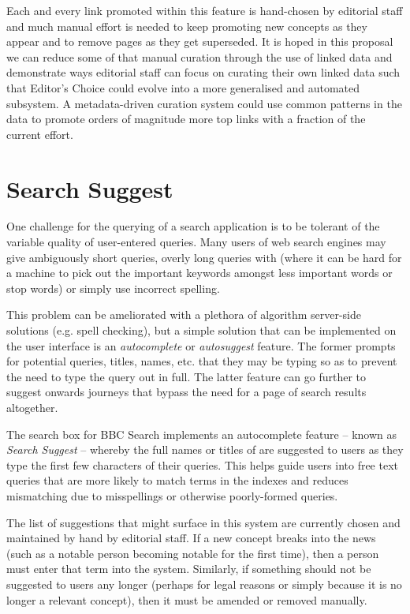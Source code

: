 Each and every link promoted within this feature is hand-chosen by editorial
staff and much manual effort is needed to keep promoting new concepts
as they appear and to remove pages as they get superseded. It is hoped
in this proposal we can reduce some of that manual curation through the use
of linked data and demonstrate ways editorial staff can focus on curating
their own linked data such that Editor's Choice could evolve into a more
generalised and automated subsystem. A metadata-driven curation system
could use common patterns in the data to promote orders of magnitude more
top links with a fraction of the current effort.

\section{Search Suggest}

One challenge for the querying of a search application is to be tolerant
of the variable quality of user-entered queries. Many users of web search
engines may give ambiguously short queries, overly long queries with (where
it can be hard for a machine to pick out the important keywords amongst
less important words or stop words\cite{rajaraman2011data})
or simply use incorrect spelling.

This problem can be ameliorated with a plethora of algorithm
server-side solutions (e.g. spell checking), but a simple solution that
can be implemented on the user interface is an \emph{autocomplete}
or \emph{autosuggest} feature. The former prompts for potential
queries, titles, names, etc. that they may be typing so as to prevent
the need to type the query out in full. The latter feature can go
further to suggest onwards journeys that bypass the need for a
page of search results altogether.

The search box for BBC Search implements an autocomplete
feature -- known
as \emph{Search Suggest} -- whereby
the full names or titles of are suggested to users as they type the first
few characters of their queries. This helps guide users into free text
queries that are more likely to match terms in the indexes and reduces
mismatching due to misspellings or otherwise poorly-formed queries.

The list of suggestions that might surface in this system are
currently chosen and maintained by hand by editorial staff. If a new
concept breaks into the news (such as a notable person becoming notable
for the first time), then a person must enter that term into the system.
Similarly, if something should not be suggested to users any longer
(perhaps for legal reasons or simply because it is no longer a relevant
concept), then it must be amended or removed manually.

